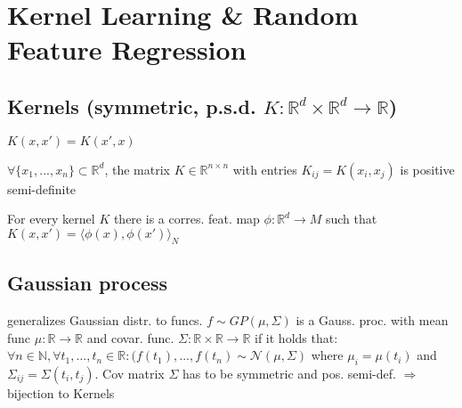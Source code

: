 \section{Kernel Learning \& Random Feature Regression}
\subsection*{Kernels (symmetric, p.s.d. $K: \mathbb{R}^d \times \mathbb{R}^d \rightarrow \mathbb{R}$)}
\begin{inparaitem}[$\color{mygreen} \triangleright$]
\item $K(x, x') = K(x', x)$
\item {} $\forall \{x_1, ..., x_n\} \subset \mathbb{R}^d$, the matrix $K \in \mathbb{R}^{n \times n}$ with entries $K_{ij} = K(x_i, x_j)$ is positive semi-definite\\
\end{inparaitem}
 For every kernel $K$ there is a corres. feat. map $\phi: \mathbb{R}^d \rightarrow M$ such that $K(x,x') = \langle\phi(x), \phi(x')\rangle_N$

\subsection*{Gaussian process} generalizes Gaussian distr. to funcs. $f \sim GP(\mu, \Sigma)$ is a Gauss. proc. with mean func $\mu: \mathbb{R} \rightarrow \mathbb{R}$ and covar. func. $\Sigma: \mathbb{R} \times \mathbb{R} \rightarrow \mathbb{R}$ if it holds that:\\
$\forall n \in \mathbb{N}, \forall t_1, ..., t_n \in \mathbb{R}: (f(t_1), ..., f(t_n) \sim \mathcal{N}(\mu, \Sigma)$ where $\mu_i = \mu(t_i)$ and $\Sigma_{ij} = \Sigma(t_i, t_j)$. Cov matrix $\Sigma$ has to be symmetric and pos. semi-def. $\Rightarrow$ bijection to Kernels


